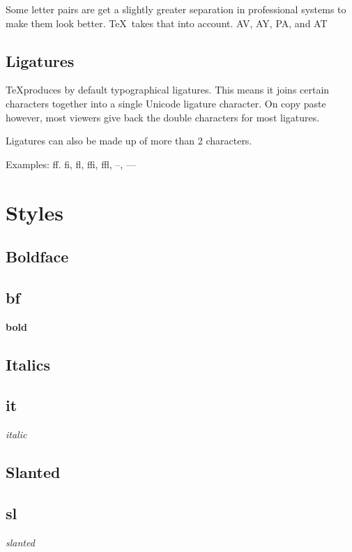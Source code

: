     Some letter pairs are get a slightly greater separation in professional systems to make them look better. \TeX\ takes that into account. AV, AY, PA, and AT

  \subsection{Ligatures}

    \TeX produces by default typographical ligatures. This means it joins certain characters together into a single Unicode ligature character. On copy paste however, most viewers give back the double characters for most ligatures.

    Ligatures can also be made up of more than 2 characters.

    Examples: ff. fi, fl, ffi, ffl, --, ---

\section{Styles}

  \subsection{Boldface}

  \subsection{bf}

    {\bf bold}

  \subsection{Italics}

  \subsection{it}

    {\it italic}

  \subsection{Slanted}

  \subsection{sl}

    {\sl slanted}

